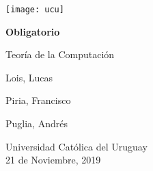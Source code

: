 \begin{titlepage}
    \begin{center}
        \texttt{[image: ucu]}

	\vspace*{5cm}

        \Huge
        \textbf{Obligatorio}

        \vspace{0.5cm}
        \LARGE
	Teoría de la Computación

        \vspace{3.5cm}

        Lois, Lucas

        Piria, Francisco

        Puglia, Andrés

        \vfill

        \Large
        Universidad Católica del Uruguay\\
        21 de Noviembre, 2019

    \end{center}
\end{titlepage}
